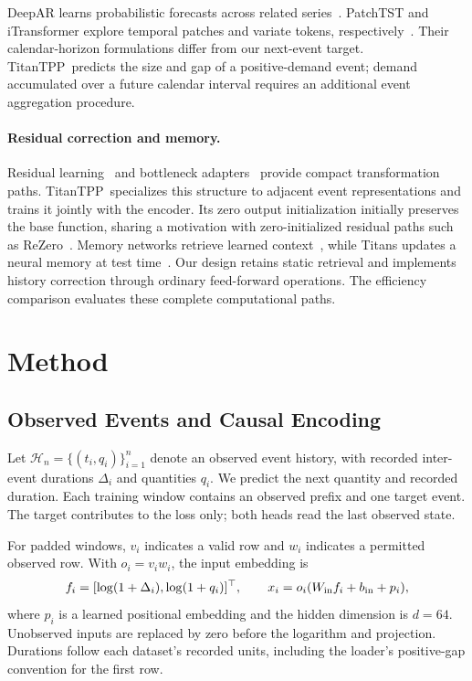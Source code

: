 \documentclass[runningheads]{llncs}
\newcommand{\method}{TitanTPP}
\newcommand{\Hcal}{\mathcal{H}}
\begin{document}
DeepAR learns probabilistic forecasts across related
series~\cite{salinas2020deepar}. PatchTST and iTransformer explore temporal
patches and variate tokens, respectively~\cite{nie2023patchtst,liu2024itransformer}.
Their calendar-horizon formulations differ from our next-event target.
\method\ predicts the size and gap of a positive-demand event; demand
accumulated over a future calendar interval requires an additional event
aggregation procedure.

\paragraph{Residual correction and memory.}
Residual learning~\cite{he2016residual} and bottleneck
adapters~\cite{houlsby2019adapters} provide compact transformation paths.
\method\ specializes this structure to adjacent event representations and
trains it jointly with the encoder. Its zero output initialization initially
preserves the base function, sharing a motivation with zero-initialized
residual paths such as ReZero~\cite{bachlechner2021rezero}.
Memory networks retrieve learned context~\cite{sukhbaatar2015memory}, while
Titans updates a neural memory at test time~\cite{behrouz2025titans}.
Our design retains static retrieval and implements history correction through
ordinary feed-forward operations. The efficiency comparison evaluates these
complete computational paths.

\section{Method}
\subsection{Observed Events and Causal Encoding}
Let $\Hcal_n=\{(t_i,q_i)\}_{i=1}^{n}$ denote an observed event history,
with recorded inter-event durations $\Delta_i$ and quantities $q_i$.
We predict the next quantity and recorded duration. Each training window
contains an observed prefix and one target event. The target contributes to
the loss only; both heads read the last observed state.

For padded windows, $v_i$ indicates a valid row and $w_i$ indicates a permitted
observed row. With $o_i=v_iw_i$, the input embedding is
\begin{equation}
 f_i=[\log(1+\Delta_i),\log(1+q_i)]^\top,\qquad
 x_i=o_i(W_{\rm in}f_i+b_{\rm in}+p_i),
 \label{eq:input}
\end{equation}
where $p_i$ is a learned positional embedding and the hidden dimension is
$d=64$. Unobserved inputs are replaced by zero before the logarithm and
projection. Durations follow each dataset's recorded units, including the
loader's positive-gap convention for the first row.
\end{document}
